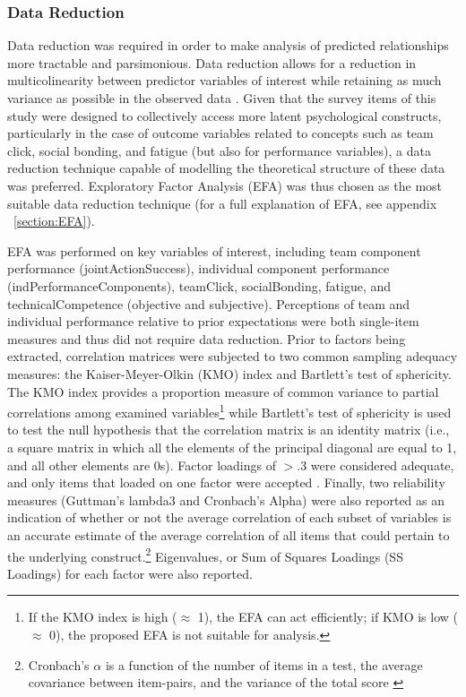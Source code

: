\subsubsection{Data Reduction} \label{subsection:dataReduction}
Data reduction was required in order to make analysis of predicted relationships more tractable and parsimonious. Data reduction allows for a reduction in multicolinearity between predictor variables of interest while retaining as much variance as possible in the observed data \citep{Yong2013}.  Given that the survey items of this study were designed to collectively access more latent psychological constructs, particularly in the case of outcome variables related to concepts such as team click, social bonding, and fatigue (but also for performance variables), a data reduction technique capable of modelling the theoretical structure of these data was preferred.  Exploratory Factor Analysis (EFA) was thus chosen as the most suitable data reduction technique (for a full explanation of EFA, see appendix ~\ref{section:EFA}).

EFA was performed on key variables of interest, including team component performance (jointActionSuccess), individual component performance (indPerformanceComponents), teamClick, socialBonding, fatigue, and technicalCompetence (objective and subjective). Perceptions of team and individual performance relative to prior expectations were both single-item measures and thus did not require data reduction.  Prior to factors being extracted, correlation matrices were subjected to two common sampling adequacy measures: the Kaiser-Meyer-Olkin (KMO) index and Bartlett’s test of sphericity. The KMO index provides a proportion measure of common variance to partial correlations among examined variables\footnote{If the KMO index is high ($\approx$ 1), the EFA can act efficiently; if KMO is low ($\approx$ 0), the proposed EFA is not suitable for analysis.} while Bartlett’s test of sphericity is used to test the null hypothesis that the correlation matrix is an identity matrix (i.e., a square matrix in which all the elements of the principal diagonal are equal to 1, and all other elements are 0s). Factor loadings of $> .3$ were considered adequate, and only items that loaded on one factor were accepted \citep{Field2012}. Finally, two reliability measures (Guttman's lambda3 and Cronbach's Alpha) were also reported as an indication of whether or not the average correlation of each subset of variables is an accurate estimate of the average correlation of all items that could pertain to the underlying construct.\footnote{Cronbach's $\alpha$ is a function of the number of items in a test, the average covariance between item-pairs, and the variance of the total score \citep{Tabachnick2007}} Eigenvalues, or Sum of Squares Loadings (SS Loadings) for each factor were also reported\citep{Dziuban1974}.

